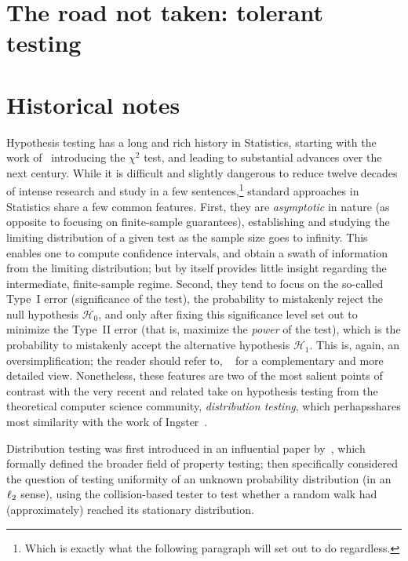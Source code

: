 \section{The road not taken: tolerant testing}
\tbc
\section{Historical notes}
Hypothesis testing has a long and rich history in Statistics, starting with the work of~\citet{Pearson1900} introducing the $\chi^2$ test, and leading to substantial advances over the next century. While it is difficult and slightly dangerous to reduce twelve decades of intense research and study in a few sentences,\footnote{Which is exactly what the following paragraph will set out to do regardless.} standard approaches in Statistics share a few common features. First, they are \emph{asymptotic} in nature (as opposite to focusing on finite-sample guarantees), establishing and studying the limiting distribution of a given test as the sample size goes to infinity. This enables one to compute confidence intervals, and obtain a swath of information from the limiting distribution; but by itself provides little insight regarding the intermediate, finite-sample regime. Second, they tend to focus on the so-called Type~I error (significance of the test), \ie the probability to mistakenly reject the null hypothesis $\mathcal{H}_0$, and only after fixing this significance level set out to minimize the Type~II error (that is, maximize the \emph{power} of the test), which is the probability to mistakenly accept the alternative hypothesis $\mathcal{H}_1$. This is, again, an oversimplification; the reader should refer to, \eg~\citet{BalakrishnanW18} for a complementary and more detailed view. Nonetheless, these features are two of the most salient points of contrast with the very recent and related take on hypothesis testing from the theoretical computer science community, \emph{distribution testing}, which perhapsshares most similarity with the work of Ingster~\citep{Ingster86,Ingster97}.

Distribution testing was first introduced in an influential paper by~\citet{GoldreichGR98}, which formally defined the broader field of property testing; \citet{GoldreichR00} then specifically considered the question of testing uniformity of an unknown probability distribution (in an~$\lp[2]$ sense), using the collision-based tester to test whether a random walk had (approximately) reached its stationary distribution.

